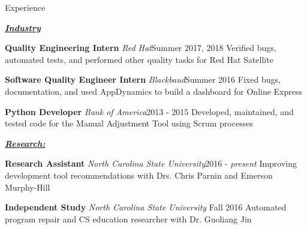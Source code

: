 \documentclass{resume} %
\begin{document}
\vspace{-12pt}


\begin{rSection}{Experience}
\vspace{-4pt}

\underline{\textbf{\textit{Industry}}}
\vspace{-7pt}

\begin{eSubsection}{\textbf{Quality Engineering Intern} \textit{Red Hat}}{Summer 2017, 2018}
{Verified bugs, automated tests, and performed other quality tasks for Red Hat Satellite}
\end{eSubsection}
\vspace{-7pt}

\begin{eSubsection}{\textbf{Software Quality Engineer Intern} \textit{Blackbaud}}{Summer 2016}
{Fixed bugs, documentation, and used AppDynamics to build a dashboard for Online Express}
\item 
\end{eSubsection}
\vspace{-7pt}

\begin{eSubsection}{\textbf{Python Developer} \textit{Bank of America}}{2013 - 2015}
{Developed, maintained, and tested code for the Manual Adjustment Tool using Scrum processes}
\item 
\end{eSubsection}
\vspace{-7pt}

\underline{\textbf{\textit{Research:}}}
\vspace{-7pt}

\begin{eSubsection}{\textbf{Research Assistant} \textit{North Carolina State University}}{2016 - \textit{present}}
{Improving development tool recommendations with Drs. Chris Parnin and Emerson Murphy-Hill}
\end{eSubsection}
\vspace{-7pt}

\begin{eSubsection}{\textbf{Independent Study} \textit{North Carolina State University} }{Fall 2016}
{Automated program repair and CS education researcher with Dr. Guoliang Jin}
\item 
\end{eSubsection}
\vspace{-7pt}


\end{rSection}
\end{document}
